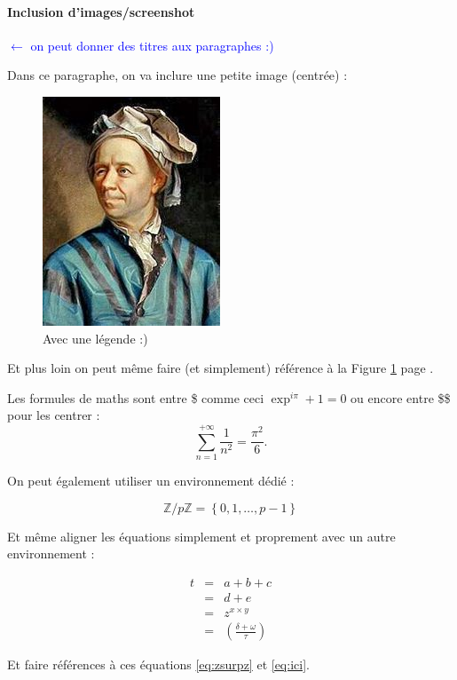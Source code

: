 \documentclass[a4paper, 12pt]{article}
\begin{document}
\paragraph{Inclusion d'images/screenshot} \textcolor{blue}{$\leftarrow$ on peut donner des titres aux paragraphes :)} 

Dans ce paragraphe, on va inclure une petite image (centrée) :

\begin{figure}[h]
\centering
\includegraphics[scale=.5]{images/euler.jpg}
\caption{\label{euler}Avec une légende :)}
\end{figure}

Et plus loin on peut même faire (et simplement) référence à la Figure \ref{euler} page \pageref{euler}.

Les formules de maths sont entre \$ comme ceci $\exp^{i\pi} + 1 = 0$ ou encore entre \$\$ pour les centrer : $$\sum_{n=1}^{+\infty} \frac{1}{n^2} = \frac{\pi^2}{6}.$$

On peut également utiliser un environnement dédié :

\begin{equation}
\label{eq:zsurpz}
\mathbb{Z}/p\mathbb{Z} = \left\lbrace 0, 1, \ldots, p-1  \right\rbrace
\end{equation}

Et même aligner les équations simplement et proprement avec un autre environnement :

\begin{eqnarray}
t &=& a+b+c\\
&=& d+e \\
&=& z^{x\times y}\label{eq:ici}\\
&=& \left(\frac{\delta + \omega}{\tau}\right)
\end{eqnarray}

Et faire références à ces équations \eqref{eq:zsurpz} et \eqref{eq:ici}.
\end{document}
